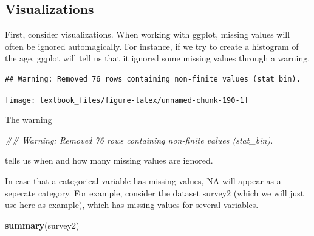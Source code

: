 \documentclass[]{tufte-book}
\newenvironment{Shaded}{}{}
\newcommand{\CommentTok}[1]{\textcolor[rgb]{0.38,0.63,0.69}{\textit{#1}}}
\newcommand{\DataTypeTok}[1]{\textcolor[rgb]{0.56,0.13,0.00}{#1}}
\newcommand{\DecValTok}[1]{\textcolor[rgb]{0.25,0.63,0.44}{#1}}
\newcommand{\KeywordTok}[1]{\textcolor[rgb]{0.00,0.44,0.13}{\textbf{#1}}}
\newcommand{\NormalTok}[1]{#1}
\newcommand{\OperatorTok}[1]{\textcolor[rgb]{0.40,0.40,0.40}{#1}}
\newcommand{\StringTok}[1]{\textcolor[rgb]{0.25,0.44,0.63}{#1}}
\begin{document}
\hypertarget{visualizations}{%
\subsection{Visualizations}\label{visualizations}}

First, consider visualizations. When working with ggplot, missing values will often be ignored automagically. For instance, if we try to create a histogram of the age, ggplot will tell us that it ignored some missing values through a warning.

\begin{Shaded}
\end{Shaded}

\begin{verbatim}
## Warning: Removed 76 rows containing non-finite values (stat_bin).
\end{verbatim}

\texttt{[image: textbook\_files/figure-latex/unnamed-chunk-190-1]}

The warning

\begin{Shaded}
\begin{Highlighting}[]
\CommentTok{## Warning: Removed 76 rows containing non-finite values (stat_bin).}
\end{Highlighting}
\end{Shaded}

tells us when and how many missing values are ignored.

In case that a categorical variable has missing values, NA will appear as a seperate category. For example, consider the dataset survey2 (which we will just use here as example), which has missing values for several variables.

\begin{Shaded}
\begin{Highlighting}[]
\KeywordTok{summary}\NormalTok{(survey2)}
\end{Highlighting}
\end{Shaded}
\end{document}

